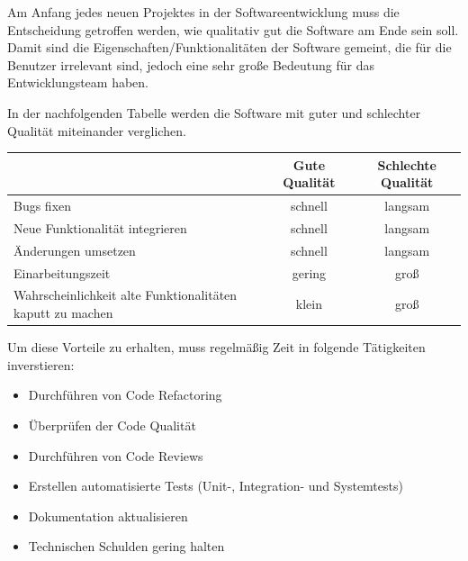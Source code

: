 

    Am Anfang jedes neuen Projektes in der Softwareentwicklung muss die Entscheidung getroffen werden, wie qualitativ gut die Software am Ende sein soll.
    Damit sind die Eigenschaften/Funktionalitäten der Software gemeint, die für die Benutzer irrelevant sind, jedoch eine sehr große Bedeutung 
    für das Entwicklungsteam haben.
    
    In der nachfolgenden Tabelle werden die Software mit guter und schlechter Qualität miteinander verglichen.

    \begin{tabular}{ |l|c|c| } 
        \hline
                                                                & Gute Qualität & Schlechte Qualität \\ 
                                                                \hline
        Bugs fixen                                              & schnell       & langsam \\ 
        Neue Funktionalität integrieren                         & schnell       & langsam \\
        Änderungen umsetzen                                     & schnell       & langsam \\ 
        Einarbeitungszeit                                       & gering        & groß \\
        Wahrscheinlichkeit alte Funktionalitäten kaputt zu machen & klein       & groß \\
        \hline
       \end{tabular}


    Um diese Vorteile zu erhalten, muss regelmäßig Zeit in folgende Tätigkeiten inverstieren:
    \begin{itemize}
        \item Durchführen von Code Refactoring
        \item Überprüfen der Code Qualität
        \item Durchführen von Code Reviews
        \item Erstellen automatisierte Tests (Unit-, Integration- und Systemtests)
        \item Dokumentation aktualisieren
        \item Technischen Schulden gering halten
    \end{itemize}


